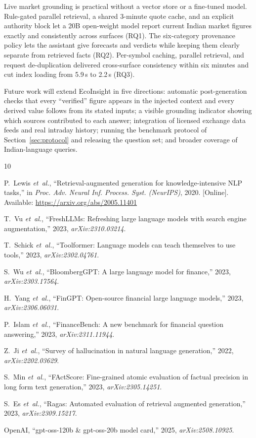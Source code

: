 \documentclass[conference]{IEEEtran}
\begin{document}
Live market grounding is practical without a vector store or a fine-tuned model. Rule-gated parallel retrieval, a shared 3-minute quote cache, and an explicit authority block let a 20B open-weight model report current Indian market figures exactly and consistently across surfaces (RQ1). The six-category provenance policy lets the assistant give forecasts and verdicts while keeping them clearly separate from retrieved facts (RQ2). Per-symbol caching, parallel retrieval, and request de-duplication delivered cross-surface consistency within six minutes and cut index loading from 5.9\,s to 2.2\,s (RQ3).

Future work will extend EcoInsight in five directions: automatic post-generation checks that every ``verified'' figure appears in the injected context and every derived value follows from its stated inputs; a visible grounding indicator showing which sources contributed to each answer; integration of licensed exchange data feeds and real intraday history; running the benchmark protocol of Section~\ref{sec:protocol} and releasing the question set; and broader coverage of Indian-language queries.

\begin{thebibliography}{10}

P.~Lewis \emph{et~al.}, ``Retrieval-augmented generation for knowledge-intensive {NLP} tasks,'' in \emph{Proc. Adv. Neural Inf. Process. Syst. (NeurIPS)}, 2020. [Online]. Available: \url{https://arxiv.org/abs/2005.11401}

T.~Vu \emph{et~al.}, ``{FreshLLMs}: Refreshing large language models with search engine augmentation,'' 2023, \emph{arXiv:2310.03214}.

T.~Schick \emph{et~al.}, ``Toolformer: Language models can teach themselves to use tools,'' 2023, \emph{arXiv:2302.04761}.

S.~Wu \emph{et~al.}, ``{BloombergGPT}: A large language model for finance,'' 2023, \emph{arXiv:2303.17564}.

H.~Yang \emph{et~al.}, ``{FinGPT}: Open-source financial large language models,'' 2023, \emph{arXiv:2306.06031}.

P.~Islam \emph{et~al.}, ``{FinanceBench}: A new benchmark for financial question answering,'' 2023, \emph{arXiv:2311.11944}.

Z.~Ji \emph{et~al.}, ``Survey of hallucination in natural language generation,'' 2022, \emph{arXiv:2202.03629}.

S.~Min \emph{et~al.}, ``{FActScore}: Fine-grained atomic evaluation of factual precision in long form text generation,'' 2023, \emph{arXiv:2305.14251}.

S.~Es \emph{et~al.}, ``{Ragas}: Automated evaluation of retrieval augmented generation,'' 2023, \emph{arXiv:2309.15217}.

OpenAI, ``gpt-oss-120b \& gpt-oss-20b model card,'' 2025, \emph{arXiv:2508.10925}.

\end{thebibliography}
\end{document}
